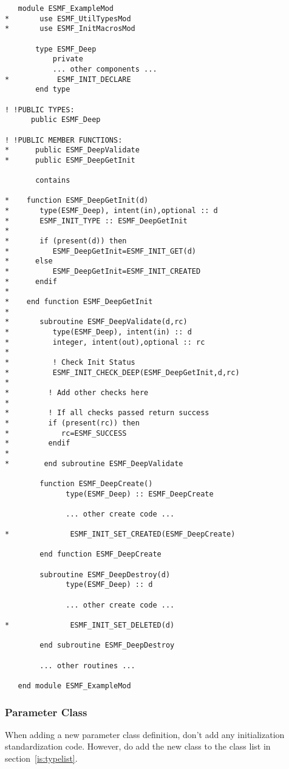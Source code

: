\begin{verbatim}
   module ESMF_ExampleMod
*       use ESMF_UtilTypesMod 
*       use ESMF_InitMacrosMod       

       type ESMF_Deep
           private
           ... other components ...
*           ESMF_INIT_DECLARE
       end type

! !PUBLIC TYPES:
      public ESMF_Deep

! !PUBLIC MEMBER FUNCTIONS:
*      public ESMF_DeepValidate     
*      public ESMF_DeepGetInit     

       contains

*    function ESMF_DeepGetInit(d)
*       type(ESMF_Deep), intent(in),optional :: d
*       ESMF_INIT_TYPE :: ESMF_DeepGetInit
*
*       if (present(d)) then
*          ESMF_DeepGetInit=ESMF_INIT_GET(d)
*      else
*          ESMF_DeepGetInit=ESMF_INIT_CREATED
*      endif
*
*    end function ESMF_DeepGetInit
*
*       subroutine ESMF_DeepValidate(d,rc)
*          type(ESMF_Deep), intent(in) :: d
*          integer, intent(out),optional :: rc
*
*          ! Check Init Status
*          ESMF_INIT_CHECK_DEEP(ESMF_DeepGetInit,d,rc)
*
*         ! Add other checks here
*
*         ! If all checks passed return success
*         if (present(rc)) then
*            rc=ESMF_SUCCESS
*         endif
*
*        end subroutine ESMF_DeepValidate

        function ESMF_DeepCreate()
              type(ESMF_Deep) :: ESMF_DeepCreate

              ... other create code ...

*              ESMF_INIT_SET_CREATED(ESMF_DeepCreate)

        end function ESMF_DeepCreate

        subroutine ESMF_DeepDestroy(d)
              type(ESMF_Deep) :: d

              ... other create code ...

*              ESMF_INIT_SET_DELETED(d)

        end subroutine ESMF_DeepDestroy

        ... other routines ...

   end module ESMF_ExampleMod
\end{verbatim}

\subsubsection{Parameter Class}

When adding a new parameter class definition, don't add any initialization
standardization code. However, do add the new class to the class list in
section~\ref{is:typelist}.

